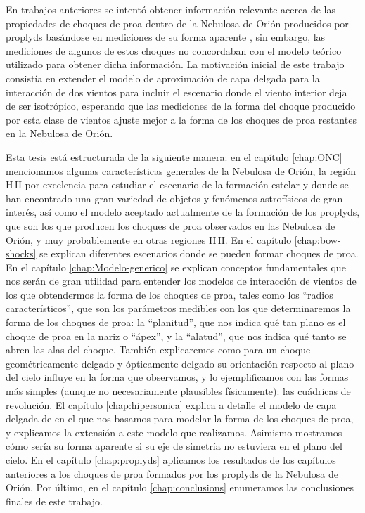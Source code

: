 \documentclass[11pt, twoside]{book}
\newcommand\Ion[2]{\ensuremath{\mathrm{#1\,\scriptstyle #2}}} %
\begin{document}
En trabajos anteriores se intentó obtener información relevante acerca de las propiedades de choques de proa dentro de la Nebulosa de Orión producidos por proplyds basándose en mediciones de su forma aparente \citep{Robberto:2005}, sin embargo, las mediciones de algunos de estos choques no concordaban con el modelo teórico utilizado para obtener dicha información. La motivación inicial de este trabajo consistía en extender el modelo de aproximación de capa delgada para la interacción de dos vientos \citep{Canto:1996} para incluir el escenario donde el viento interior deja de ser isotrópico, esperando que las mediciones de la forma del choque producido por esta clase de vientos ajuste mejor a la forma de los choques de proa restantes en la Nebulosa de Orión.

Esta tesis está estructurada de la siguiente manera: en el capítulo \ref{chap:ONC} mencionamos algunas características generales de la Nebulosa de Orión, la región \Ion{H}{II} por excelencia para estudiar el escenario de la formación estelar y donde se han encontrado una gran variedad de objetos y fenómenos astrofísicos de gran interés, así como el modelo aceptado actualmente de la formación de los proplyds, que son los que producen los choques de proa observados en las Nebulosa de Orión, y muy probablemente en otras regiones \Ion{H}{II}. En el capítulo \ref{chap:bow-shocks} se explican diferentes escenarios donde se pueden formar choques de proa. En el capítulo \ref{chap:Modelo-generico} se explican conceptos fundamentales que nos serán de gran utilidad para entender los modelos de interacción de vientos de los que obtendermos la forma de los choques de proa, tales como los ``radios característicos'', que son los parámetros medibles con los que determinaremos la forma de los choques de proa: la ``planitud'', que nos indica qué tan plano es el choque de proa en la nariz o ``ápex'', y la ``alatud'', que nos indica qué tanto se abren las alas del choque. También explicaremos como para un choque geométricamente delgado y ópticamente delgado su orientación respecto al plano del cielo influye en la forma que observamos, y lo ejemplificamos con las formas más simples (aunque no necesariamente plausibles físicamente): las cuádricas de revolución. El capítulo \ref{chap:hipersonica} explica a detalle el modelo de capa delgada de \citet{Canto:1996} en el que nos basamos para modelar la forma de los choques de proa, y explicamos la extensión a este modelo que realizamos. Asimismo mostramos cómo sería su forma aparente si su eje de simetría no estuviera en el plano del cielo. En el capítulo \ref{chap:proplyds} aplicamos los resultados de los capítulos anteriores a los choques de proa formados por los proplyds de la Nebulosa de Orión. Por último, en el capítulo \ref{chap:conclusions} enumeramos las conclusiones finales de este trabajo.
\end{document}
